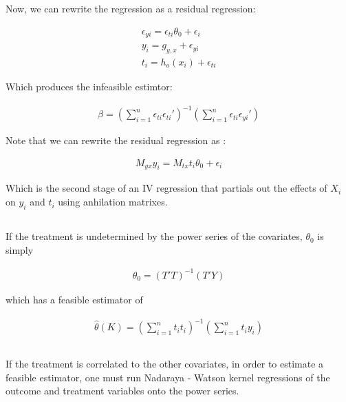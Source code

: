 \documentclass[12pt]{article}
\begin{document}
Now, we can rewrite the regression as a residual regression:

\begin{gather*}
\epsilon_{yi} =  \epsilon_{ti}\theta_0 + \epsilon_i\\
y_i = g_{y,x} + \epsilon_{yi}\\
t_i =  h_o(x_i) + \epsilon_{ti}
\end{gather*}

Which produces the infeasible estimtor:

\begin{gather*}
\beta = \left( \sum\limits_{i=1}^n \epsilon_{ti} \epsilon_{ti}' \right)^{-1} \left( \sum\limits_{i=1}^n \epsilon_{ti} \epsilon_{yi}' \right)
\end{gather*}

Note that we can rewrite the residual regression as :

\begin{gather*}
M_{yx} y_i = M_{tx} t_i \theta_0 + \epsilon_i
\end{gather*}

Which is the second stage of an IV regression that partials out the effects of $X_i$ on $y_i$ and $t_i$ using anhilation matrixes.

\subsection{}
\subsubsection{}

If the treatment is undetermined by the power series of the covariates, $\theta_0$ is simply

\begin{gather*}
\theta_0 = (T'T)^{-1}(T'Y)
\end{gather*}

which has a feasible estimator of

\begin{gather*}
\hat{\theta}(K) =(\sum\limits_{i=1}^{n} t_i t_i)^{-1}  (\sum\limits_{i=1}^{n} t_i y_i)\\
\end{gather*}










\subsubsection{}
If the treatment is correlated to the other covariates, in order to estimate a feasible estimator, one must run Nadaraya - Watson kernel regressions of the outcome and treatment variables onto the power series.
\end{document}
